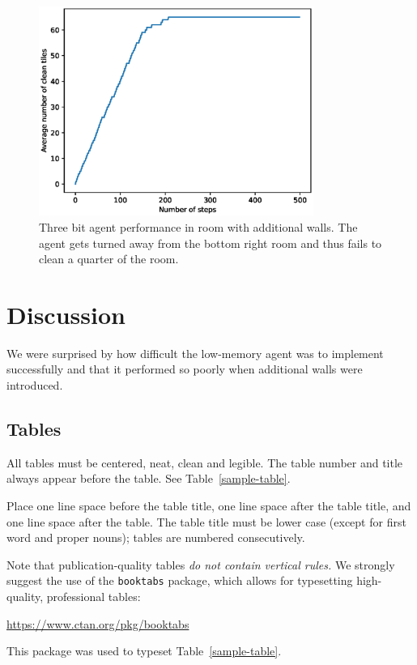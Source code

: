 \documentclass{article}
\begin{document}
\begin{figure}
  \centering
  \includegraphics[width=0.8\textwidth]{FancyExtraWallPerformance}
  \caption{Three bit agent performance in room with additional walls. The agent gets turned away from the bottom right room and thus fails to clean a quarter of the room. }
  \label{fig:FancyExtraWall}
\end{figure}
\section{Discussion}

We were surprised by how difficult the low-memory agent was to implement successfully and that it performed so poorly when additional walls were introduced.


\subsection{Tables}


All tables must be centered, neat, clean and legible.  The table number and
title always appear before the table.  See Table~\ref{sample-table}.


Place one line space before the table title, one line space after the
table title, and one line space after the table. The table title must
be lower case (except for first word and proper nouns); tables are
numbered consecutively.


Note that publication-quality tables \emph{do not contain vertical rules.} We
strongly suggest the use of the \verb+booktabs+ package, which allows for
typesetting high-quality, professional tables:
\begin{center}
  \url{https://www.ctan.org/pkg/booktabs}
\end{center}
This package was used to typeset Table~\ref{sample-table}.
\end{document}
